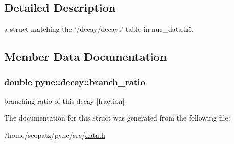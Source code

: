 \subsection{Detailed Description}
a struct matching the '/decay/decays' table in nuc\-\_\-data.\-h5. 

\subsection{Member Data Documentation}
\hypertarget{structpyne_1_1decay_a21a58630e6aac8aa5517fb9d1bafe5d6}{
\subsubsection[{branch\-\_\-ratio}]{\setlength{\rightskip}{0pt plus 5cm}double pyne\-::decay\-::branch\-\_\-ratio}}\label{structpyne_1_1decay_a21a58630e6aac8aa5517fb9d1bafe5d6}
branching ratio of this decay \mbox{[}fraction\mbox{]} 

The documentation for this struct was generated from the following file\-:\begin{DoxyCompactItemize}
\item 
/home/scopatz/pyne/src/\hyperlink{data_8h}{data.\-h}\end{DoxyCompactItemize}
